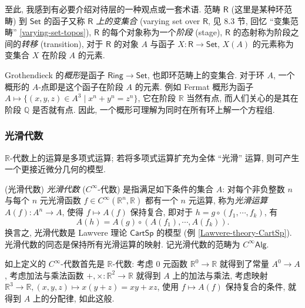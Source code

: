 \begin{remark}
	{}
	至此, 我感到有必要介绍对待层的一种观点或一套术语. 范畴 $\mathsf{R}$ (这里是某种环范畴) 到 $\mathsf {Set}$ 的函子又称 \emph{$\mathsf {R}$ 上的变集合} (varying set over $\mathsf R$, 见 \cite{SDG-Lavendhomme} 8.3 节, 回忆 ``变集范畴'' \ref{varying-set-topos}),
	$\mathsf R$ 的每个对象称为一个\emph{阶段} (stage), $\mathsf R$ 的态射称为阶段之间的\emph{转移} (transition), 对于 $\mathsf R$ 的对象 $A$ 与函子 $X\colon \mathsf R\to\mathsf {Set}$, $X(A)$ 的元素称为变集合 $X$ 在阶段 $A$ 的元素.
	
	Grothendieck 的\emph{概形}是函子 $\mathsf {Ring}\to\mathsf {Set}$, 也即环范畴上的变集合. 对于环 $A$, 一个概形的 $A$-点即是这个函子在阶段 $A$ 的元素. 例如 Fermat 概形为函子 $A\mapsto \{(x,y,z)\in A^3\mid x^n+y^n=z^n\}$, 它在阶段 $\mathbb{R}$ 当然有点, 而人们关心的是其在阶段 $\mathbb{Q}$ 是否就有点. 因此, 一个概形可理解为同时在所有环上解一个方程组.
\end{remark}



\subsubsection{光滑代数}

$\mathbb{R}$-代数上的运算是多项式运算; 若将多项式运算扩充为全体 ``光滑'' 运算, 则可产生一个更接近微分几何的模型.

\begin{definition}
	{(光滑代数)}
	\emph{光滑代数} ($C^\infty$-代数) 是指满足如下条件的集合 $A$: 对每个非负整数 $n$ 与每个 $n$ 元光滑函数 $f\in C^\infty (\mathbb{R}^n,\mathbb{R})$ 都有一个 $n$ 元运算, 称为\emph{光滑运算} $A(f)\colon A^n\to A$,
	使得 $f\mapsto A(f)$ 保持复合, 即对于 $h = g \circ (f_1,\cdots,f_k)$, 有
	$$A(h) = A(g) \circ (A(f_1),\cdots,A(f_k)).$$ 换言之, 光滑代数是 Lawvere 理论 $\mathsf {CartSp}$ 的模型 (例 \ref{Lawvere-theory-CartSp}). 光滑代数的同态是保持所有光滑运算的映射. 记光滑代数的范畴为 $C^\infty\mathsf{Alg}$.
\end{definition}

\begin{remark}
	[label={remark-smooth-algebra-R-algebra}]
	{}
	如上定义的 $C^\infty$-代数首先是 $\mathbb{R}$-代数: 考虑 $0$ 元函数 $\mathbb{R}^0\to \mathbb{R}$ 就得到了常量 $A^0\to A$,
	考虑加法与乘法函数 $+,\times\colon \mathbb{R}^2\to \mathbb{R}$ 就得到 $A$ 上的加法与乘法, 考虑映射 $\mathbb{R}^3\to \mathbb{R}, (x,y,z)\mapsto x(y+z) = xy+xz$, 使用 $f\mapsto A(f)$ 保持复合的条件, 就得到 $A$ 上的分配律, 如此这般.
\end{remark}

